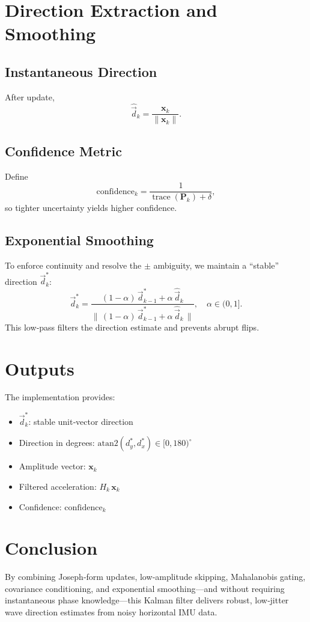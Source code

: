 \documentclass[12pt]{article}
\begin{document}
\section{Direction Extraction and Smoothing}
\subsection{Instantaneous Direction}
After update,
\[
\widehat{\vec{d}}_k
= \frac{\mathbf{x}_k}{\|\mathbf{x}_k\|}.
\]

\subsection{Confidence Metric}
Define
\[
\mathrm{confidence}_k
= \frac{1}{\operatorname{trace}(\mathbf{P}_k) + \delta},
\]
so tighter uncertainty yields higher confidence.

\subsection{Exponential Smoothing}
To enforce continuity and resolve the \(\pm\) ambiguity, we maintain a “stable” direction \(\vec{d}^*_k\):
\[
\vec{d}^*_k
= \frac{(1-\alpha)\,\vec{d}^*_{k-1} + \alpha\,\widehat{\vec{d}}_k}
       {\bigl\|\,(1-\alpha)\,\vec{d}^*_{k-1} + \alpha\,\widehat{\vec{d}}_k\,\bigr\|},
\quad \alpha\in(0,1].
\]
This low‐pass filters the direction estimate and prevents abrupt flips.

\section{Outputs}
The implementation provides:
\begin{itemize}
  \item \(\vec{d}^*_k\): stable unit‐vector direction
  \item Direction in degrees: \(\mathrm{atan2}(d^*_y,d^*_x)\in[0,180)^\circ\)
  \item Amplitude vector: \(\mathbf{x}_k\)
  \item Filtered acceleration: \(H_k\,\mathbf{x}_k\)
  \item Confidence: \(\mathrm{confidence}_k\)
\end{itemize}

\section{Conclusion}
By combining Joseph‐form updates, low‐amplitude skipping, Mahalanobis gating, covariance conditioning, and exponential smoothing—and without requiring instantaneous phase knowledge—this Kalman filter delivers robust, low‐jitter wave direction estimates from noisy horizontal IMU data.
\end{document}
